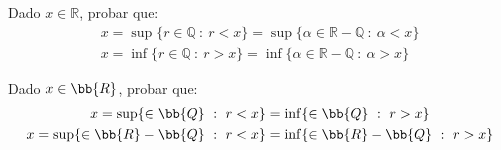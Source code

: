 \begin{ejercicio}
    Dado $x \in \mathbb{R}$, probar que:
    \begin{gather*}
        x=\sup \{r \in \mathbb{Q}~:~ r < x\}=\sup \{\alpha \in \mathbb{R}-\mathbb{Q}~:~ \alpha < x\} \\
        x=\inf \{r \in \mathbb{Q}~:~ r > x\}=\inf \{\alpha \in \mathbb{R}-\mathbb{Q}~:~ \alpha > x\}
    \end{gather*}
\end{ejercicio}

\begin{ejercicio}
    Dado $x\in \bb{R}$, probar que:
    \begin{gather*}
        x=\sup \{\in \bb{Q} ~:~ r<x\} = \inf \{\in \bb{Q} ~:~ r>x\}\\
        x=\sup \{\in \bb{R}-\bb{Q} ~:~ r<x\} = \inf \{\in \bb{R}-\bb{Q} ~:~ r>x\}
    \end{gather*}
\end{ejercicio}